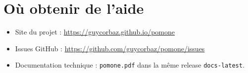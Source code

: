 \section{Où obtenir de l'aide}

\begin{itemize}
  \item Site du projet : \url{https://guycorbaz.github.io/pomone}
  \item Issues GitHub : \url{https://github.com/guycorbaz/pomone/issues}
  \item Documentation technique : \texttt{pomone.pdf} dans la même release \texttt{docs-latest}.
\end{itemize}
